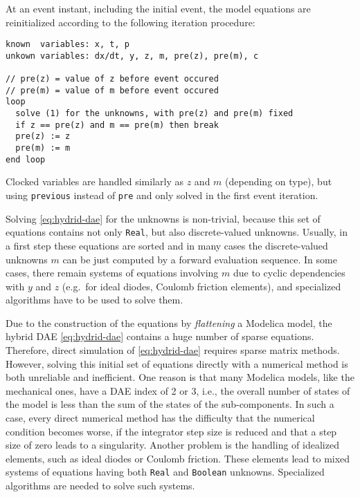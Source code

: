 At an event instant, including the initial event, the model equations
are reinitialized according to the following iteration procedure:
\begin{lstlisting}[language=modelica]
known  variables: x, t, p
unkown variables: dx/dt, y, z, m, pre(z), pre(m), c

// pre(z) = value of z before event occured
// pre(m) = value of m before event occured
loop
  solve (1) for the unknowns, with pre(z) and pre(m) fixed
  if z == pre(z) and m == pre(m) then break
  pre(z) := z
  pre(m) := m
end loop
\end{lstlisting}

Clocked variables are handled similarly as $z$ and $m$ (depending on type), but using \lstinline!previous! instead of \lstinline!pre! and only solved in the first event iteration.

Solving \eqref{eq:hydrid-dae} for the unknowns is non-trivial, because this set of equations contains not only \lstinline!Real!, but also discrete-valued unknowns.
Usually, in a first step these equations are sorted and in many cases the discrete-valued unknowns $m$ can be just computed by a forward evaluation sequence.
In some cases, there remain systems of equations involving $m$ due to cyclic dependencies with $y$ and $z$ (e.g.\ for ideal diodes, Coulomb friction elements), and specialized algorithms have to be used to solve them.

Due to the construction of the equations by \emph{flattening} a Modelica model, the hybrid DAE \eqref{eq:hydrid-dae} contains a huge number of sparse equations.
Therefore, direct simulation of \eqref{eq:hydrid-dae} requires sparse matrix methods.
However, solving this initial set of equations directly with a numerical method is both unreliable and inefficient.
One reason is that many Modelica models, like the mechanical ones, have a DAE index of 2 or 3, i.e., the overall number of states of the model is less than the sum of the states of the sub-components.
In such a case, every direct numerical method has the difficulty that the numerical condition becomes worse, if the integrator step size is reduced and that a step size of zero leads to a singularity.
Another problem is the handling of idealized elements, such as ideal diodes or Coulomb friction.
These elements lead to mixed systems of equations having both \lstinline!Real! and \lstinline!Boolean! unknowns.
Specialized algorithms are needed to solve such systems.

